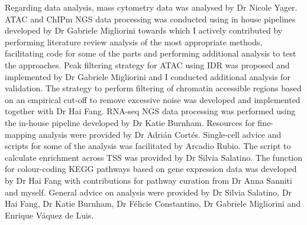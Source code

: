 {\begin{minipage}[t]{1.1\linewidth}
\noindent Regarding data analysis, mass cytometry data was analysed by Dr Nicole Yager. ATAC and ChIPm NGS data processing was conducted using in house pipelines developed by Dr Gabriele Migliorini towards which I actively contributed by performing literature review analysis of the most appropriate methods, facilitating code for some of the parts and performing additional analysis to test the approaches. Peak filtering strategy for ATAC using IDR was proposed and implemented by Dr Gabriele Migliorini and I conducted additional analysis for validation. The strategy to perform filtering of chromatin accessible regions based on an empirical cut-off to remove excessive noise was developed and implemented together with Dr Hai Fang. RNA-seq NGS data processing was performed using the in-house pipeline developed by Dr Katie Burnham. Resources for fine-mapping analysis were provided by Dr Adri\'{a}n Cort\'{e}s. Single-cell advice and scripts for some of the analysis was facilitated by Arcadio Rubio. The script to calculate enrichment across TSS was provided by Dr Silvia Salatino. The function for colour-coding KEGG pathways based on gene expression data was developed by Dr Hai Fang with contributions for pathway curation from Dr Anna Sanniti and myself. General advice on analysis were provided by Dr Silvia Salatino, Dr Hai Fang, Dr Katie Burnham, Dr F\'{e}licie Constantino, Dr Gabriele Migliorini and Enrique V\'{a}quez de Luis. 
\end{minipage}}




